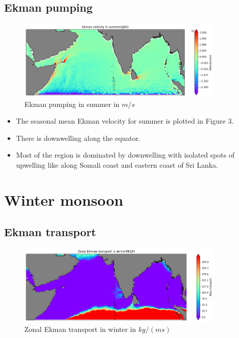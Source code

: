 \documentclass[20pt]{article}
\begin{document}
\subsection*{Ekman pumping}

\begin{figure}
    \centering
    \includegraphics[width=0.88\textwidth]{summer_we.png}
    \caption{Ekman pumping in summer in $m/s$}
\end{figure}

\begin{itemize}
    \item The seasonal mean Ekman velocity for summer is plotted in Figure 3.
    \item There is downwelling along the equator.
    \item Most of the region is dominated by downwelling with isolated spots of upwelling like along Somali coast and eastern coast of Sri Lanka.  
\end{itemize}

\section*{Winter monsoon}

\subsection*{Ekman transport}

\begin{figure}
    \centering
    \includegraphics[width=0.88\textwidth]{winter_zonal_trans.png}
    \caption{Zonal Ekman transport in winter in $kg/(m s)$}
\end{figure}
\end{document}
